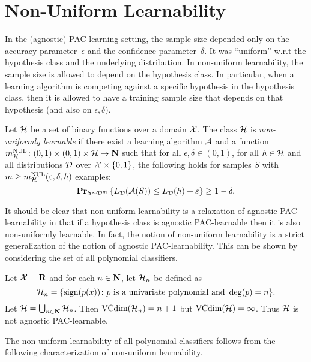 \chapter{Non-Uniform Learnability}

In the (agnostic) PAC learning setting, the sample size depended only on the
accuracy parameter~$\epsilon$ and the confidence parameter~$\delta$. It was ``uniform''
w.r.t the hypothesis class and the underlying distribution. In non-uniform
learnability, the sample size is allowed to depend on the hypothesis class.
In particular, when a learning algorithm is competing against a specific hypothesis
in the hypothesis class, then it is allowed to have a training sample size that depends
on that hypothesis (and also on $\epsilon, \delta$).

\begin{definition}
Let $\mathcal{H}$ be a set of binary functions over a domain $\mathcal{X}$.  The class
$\mathcal{H}$ is \emph{non-uniformly learnable} if there exist a learning
algorithm $\mathcal{A}$ and a function $m_{\mathcal{H}}^{\text{NUL}} \colon (0, 1) \times (0, 1)
\times \mathcal{H} \rightarrow \mathbf{N}$ such that for all $\epsilon, \delta \in (0,
1)$, for all $h \in \mathcal{H}$ and all distributions $\mathcal{D}$ over
$\mathcal{X} \times \{0, 1\}$, the following holds for samples $S$
with $m \geq m_{\mathcal{H}}^{\text{NUL}}(\varepsilon, \delta, h)$ examples:
\[
    \mathbf{Pr}_{S \sim \mathcal{D}^m} \left \{ L_{\mathcal{D}}(\mathcal{A} (S)) \leq L_{\mathcal{D}} (h) + \varepsilon \right \}
        \geq 1 - \delta.
\]
\end{definition}

It should be clear that non-uniform learnability is a relaxation of agnostic
PAC-learnability in that if a hypothesis class is agnostic PAC-learnable then it
is also non-uniformly learnable. In fact, the notion of non-uniform learnability
is a strict generalization of the notion of agnostic PAC-learnability. This can be
shown by considering the set of all polynomial classifiers.

\begin{example}
Let $\mathcal{X} = \mathbf{R}$ and for each $n \in \mathbf{N}$, let $\mathcal{H}_n$ be defined as
\[
    \mathcal{H}_n = \{\operatorname{sign} (p(x)) \colon p \text{ is a univariate polynomial and } \deg (p) = n\}.
\]
Let $\mathcal{H} = \bigcup_{n \in \mathbf{N}} \mathcal{H}_n$. Then
$\text{VCdim} (\mathcal{H}_n) = n + 1$ but $\text{VCdim} (\mathcal{H}) = \infty$. Thus $\mathcal{H}$
is not agnostic PAC-learnable.
\end{example}
The non-uniform learnability of all polynomial classifiers
follows from the following characterization of non-uniform learnability.

